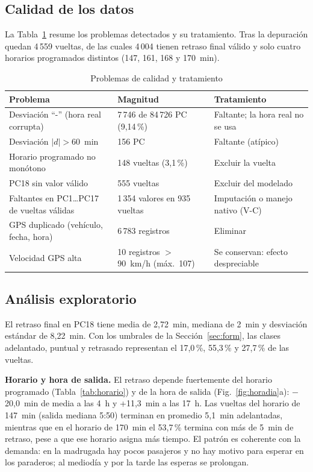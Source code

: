 \documentclass[conference]{IEEEtran}
\newcommand{\tablesize}{\fontsize{7}{8.4}\selectfont}
\begin{document}
\subsection{Calidad de los datos}
La Tabla~\ref{tab:calidad} resume los problemas detectados y su tratamiento. Tras la depuración quedan 4\,559 vueltas, de las cuales 4\,004 tienen retraso final válido y solo cuatro horarios programados distintos (147, 161, 168 y 170~min).

\begin{table}[!t]
\centering
\caption{Problemas de calidad y tratamiento}\label{tab:calidad}
\tablesize\setlength{\tabcolsep}{2.5pt}
\begin{tabular}{@{}p{2.9cm}p{2.3cm}p{2.6cm}@{}}
\toprule
Problema & Magnitud & Tratamiento \\
\midrule
Desviación ``-'' (hora real corrupta) & 7\,746 de 84\,726 PC (9,14\,\%) & Faltante; la hora real no se usa \\
Desviación $|d| > 60$~min & 156 PC & Faltante (atípico) \\
Horario programado no monótono & 148 vueltas (3,1\,\%) & Excluir la vuelta \\
PC18 sin valor válido & 555 vueltas & Excluir del modelado \\
Faltantes en PC1\ldots PC17 de vueltas válidas & 1\,354 valores en 935 vueltas & Imputación o manejo nativo (V-C) \\
GPS duplicado (vehículo, fecha, hora) & 6\,783 registros & Eliminar \\
Velocidad GPS alta & 10 registros $>$ 90~km/h (máx.~107) & Se conservan: efecto despreciable \\
\bottomrule
\end{tabular}
\end{table}

\subsection{Análisis exploratorio}
El retraso final en PC18 tiene media de 2,72~min, mediana de 2~min y desviación estándar de 8,22~min. Con los umbrales de la Sección~\ref{sec:form}, las clases adelantado, puntual y retrasado representan el 17,0\,\%, 55,3\,\% y 27,7\,\% de las vueltas.

\textbf{Horario y hora de salida.} El retraso depende fuertemente del horario programado (Tabla~\ref{tab:horario}) y de la hora de salida (Fig.~\ref{fig:horadia}a): $-$20,0~min de media a las 4~h y +11,3~min a las 17~h. Las vueltas del horario de 147~min (salida mediana 5:50) terminan en promedio 5,1~min adelantadas, mientras que en el horario de 170~min el 53,7\,\% termina con más de 5~min de retraso, pese a que ese horario asigna más tiempo. El patrón es coherente con la demanda: en la madrugada hay pocos pasajeros y no hay motivo para esperar en los paraderos; al mediodía y por la tarde las esperas se prolongan.
\end{document}
